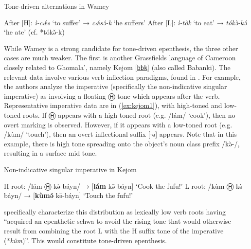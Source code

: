 \documentclass[output=paper,colorlinks,citecolor=brown,draft,draftmode]{langscibook}
\begin{document}
\begin{exe}
	\ex Tone-driven alternations in Wamey \citep[43]{santos1996} \label{ex:ksuffix}
	    \begin{xlist}
	        \ex After [H]: 	\textit{ì-cǽs}	‘to suffer’  → 	\textit{cǽsə́-k} 	‘he suffers’
	        \ex After [L]: 		\textit{ì-tòk}	‘to eat’   → \textit{tókə̀-kə́}	‘he ate' (cf. *tókə̌-k)
 	    \end{xlist}
\end{exe}


While Wamey is a strong candidate for tone-driven epenthesis, the three other cases are much weaker.
The first is another Grassfields language of Cameroon closely related to Ghomala', namely 
Kejom 
[\href{https://glottolog.org/resource/languoid/id/baba1266}{\texttt{bbk}}]
(also called Babanki).
The relevant data involve various verb inflection paradigms, found in \citet{akumbu_segmental_2020}.
For example, the authors analyze the imperative (specifically the non-indicative singular imperative) as involving  a floating 
 Ⓗ
tone which appears after the verb.
Representative imperative data are in (\ref{ex:kejom1}), with high-toned and low-toned roots.
If Ⓗ
appears with a high-toned root (e.g. /lám/ `cook'), then no overt marking is observed.
However,  if it appears with a low-toned root (e.g. /k\`{u}m/ `touch'), 
then an overt inflectional suffix [-ə] appears.
Note that in this example, there is high tone spreading onto the object's noun class prefix /kə̀-/, resulting in a surface mid tone.

\begin{exe}
	\ex Non-indicative singular imperative in Kejom \citep[11]{akumbu_segmental_2020} \label{ex:kejom1}
	    \begin{xlist}
	        \ex 	H root:	/lám Ⓗ kə̀-báyn/	→	[\textbf{lám} kə̄-báyn]		‘Cook the fufu!’
	        \ex L root:		/kùm Ⓗ kə̀-báyn/	→	[\textbf{kùmə́} kə̄-báyn]	`Touch the fufu!'
 	    \end{xlist}
\end{exe}

\noindent \citet[3]{akumbu_segmental_2020} specifically characterize this distribution as lexically low verb roots having ``acquired an epenthetic schwa to avoid the rising tone that would otherwise result from combining the root L with the H suffix tone of the imperative (*\textit{kǔm})''.
This would constitute tone-driven epenthesis. 
\end{document}
